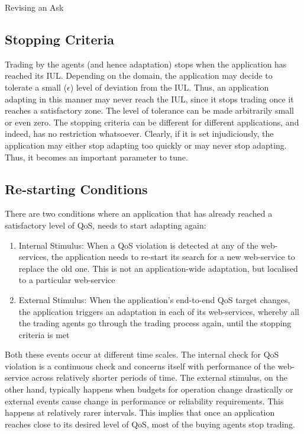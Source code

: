 \documentclass[10pt,journal,compsoc]{IEEEtran}
\begin{document}
\begin{algorithm}
 \DontPrintSemicolon
  \caption{Revising an Ask}
  \label{ask_revision}   
 \end{algorithm}
 
\subsection{Stopping Criteria}
Trading by the agents (and hence adaptation) stops when the application has reached its IUL. Depending on the domain, the application may decide to tolerate a small ($\epsilon$) level of deviation from the IUL. Thus, an application adapting in this manner may never reach the IUL, since it stops trading once it reaches a satisfactory zone. The level of tolerance can be made arbitrarily small or even zero. The stopping criteria can be different for different applications, and indeed, has no restriction whatsoever. Clearly, if it is set injudiciously, the application may either stop adapting too quickly or may never stop adapting. Thus, it becomes an important parameter to tune.

\subsection{Re-starting Conditions}
There are two conditions where an application that has already reached a satisfactory level of QoS, needs to start adapting again:
	\begin{enumerate}
	    \item Internal Stimulus: When a QoS violation is detected at any of the web-services, the application needs to re-start its search for a new web-service to replace the old one. This is not an application-wide adaptation, but localised to a particular web-service
	     \item External Stimulus: When the application's end-to-end QoS target changes, the application triggers an adaptation in each of its web-services, whereby all the trading agents go through the trading process again, until the stopping criteria is met
	\end{enumerate}
Both these events occur at different time scales. The internal check for QoS violation is a continuous check and concerns itself with performance of the web-service across relatively shorter periods of time. The external stimulus, on the other hand, typically happens when budgets for operation change drastically or external events cause change in performance or reliability requirements. This happens at relatively rarer intervals. This implies that once an application reaches close to its desired level of QoS, most of the buying agents stop trading. 	
\end{document}
